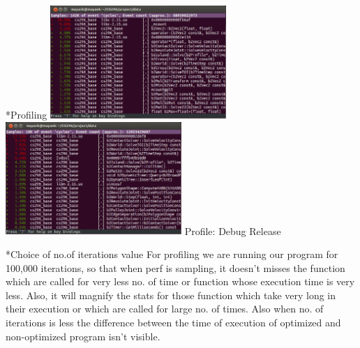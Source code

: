 \documentclass[11pt]{article}
\begin{document}
\begin{section}*{Profiling}
\includegraphics[width=0.5\textwidth,keepaspectratio]{debug.eps} \includegraphics[width=0.5\textwidth,keepaspectratio]{release.eps}
 Profile: \hspace{1in} Debug \hspace{3in} Release
\begin{subsection}*{Choice of no.of iterations value}
For profiling we are running our program for 100,000 iterations, so that when perf is sampling, it doesn't misses the function which are called for very less no. of time or function whose execution time is very less. Also, it will magnify the stats for those function which take very long in their execution or which are called for large no. of times. Also when no. of iterations is less the difference between the time of execution of optimized and non-optimized program isn't visible.~\cite{profiling}
\end{subsection}


\end{section}
\end{document}
